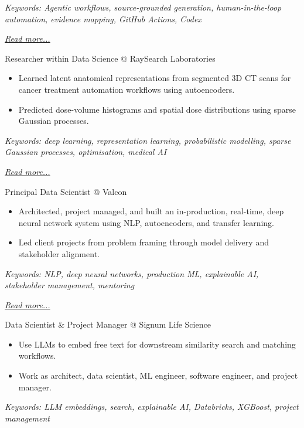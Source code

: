 \documentclass[11pt,a4paper]{moderncv}
\begin{document}
{\footnotesize\textit{Keywords: Agentic workflows, source-grounded generation, human-in-the-loop automation, evidence mapping, GitHub Actions, Codex}}

\hfill{\small{\textit{\hyperref[sec:resume_builder]{Read more...}}}}

\large{Researcher within Data Science @ RaySearch Laboratories}
\normalsize
\begin{itemize}
    \item Learned latent anatomical representations from segmented 3D CT scans for cancer treatment automation workflows using autoencoders.
    \item Predicted dose-volume histograms and spatial dose distributions using sparse Gaussian processes.
\end{itemize}

{\footnotesize\textit{Keywords: deep learning, representation learning, probabilistic modelling, sparse Gaussian processes, optimisation, medical AI}}

\hfill{\small{\textit{\hyperref[sec:raysearch]{Read more...}}}}

\large{Principal Data Scientist @ Valcon}
\normalsize
\begin{itemize}
    \item Architected, project managed, and built an in-production, real-time, deep neural network system using NLP, autoencoders, and transfer learning. 
    \item Led client projects from problem framing through model delivery and stakeholder alignment.
\end{itemize}

{\footnotesize\textit{Keywords: NLP, deep neural networks, production ML, explainable AI, stakeholder management, mentoring}}

\hfill{\small{\textit{\hyperref[sec:valcon]{Read more...}}}}

\large{Data Scientist \& Project Manager @ Signum Life Science}
\normalsize
\begin{itemize}
    \item Use LLMs to embed free text for downstream similarity search and matching workflows.
    \item Work as architect, data scientist, ML engineer, software engineer, and project manager.
\end{itemize}

{\footnotesize\textit{Keywords: LLM embeddings, search, explainable AI, Databricks, XGBoost, project management}}
\end{document}
